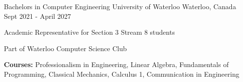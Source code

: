 

\begin{cventries}

  \cventry
    {Bachelors in Computer Engineering} %
    {University of Waterloo} %
    {Waterloo, Canada} %
    {Sept 2021 - April 2027} %
    {
      \begin{cvitems} %
        \item {Academic Representative for Section 3 Stream 8 students}
        \item {Part of Waterloo Computer Science Club}
        \item {\textbf{Courses:} Professionalism in Engineering, Linear Algebra, Fundamentals of Programming, Classical Mechanics, Calculus 1, Communication in Engineering}
      \end{cvitems}
    }
    
\end{cventries}
